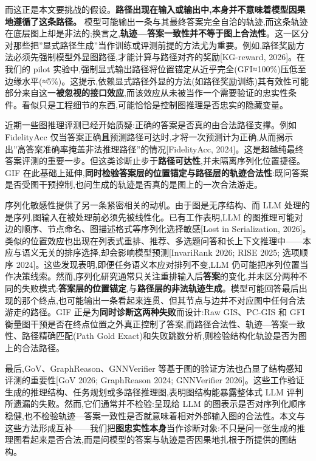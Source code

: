 \documentclass[
  11pt,
]{article}
\begin{document}
而这正是本文要挑战的假设。\textbf{路径出现在输入或输出中,本身并不意味着模型因果地遵循了这条路径。}
模型可能输出一条与其最终答案完全自洽的轨迹,而这条轨迹在底层图上却是非法的;换言之,\textbf{轨迹---答案一致性并不等于图上合法性}。这一区分对那些把''显式路径生成''当作训练或评测前提的方法尤为重要。例如,路径奖励方法必须先强制模型外显图路径,才能计算与路径对齐的奖励{[}KG-reward,
2026{]}。在我们的 pilot
实验中,强制显式输出路径将位置锚定从近乎完全(GFI≈100\%)压低至边缘水平(≈5\%)。这提示,依赖显式路径外显的方法(如路径奖励训练)其有效性可能部分来自这一\textbf{被忽视的接口效应},而该效应从未被当作一个需要验证的忠实性条件。看似只是工程细节的东西,可能恰恰是控制图推理是否忠实的隐藏变量。

近期一些图推理评测已经开始质疑:正确的答案是否真的由合法路径支撑。例如
FidelityAcc
仅当答案正确\textbf{且}预测路径可达时,才将一次预测计为正确,从而揭示出''高答案准确率掩盖非法推理路径''的情况{[}FidelityAcc,
2024{]}。这是超越纯最终答案评测的重要一步。但这类诊断止步于\textbf{路径可达性},并未隔离序列化位置捷径。GIF
在此基础上延伸,\textbf{同时检验答案层的位置锚定与路径层的轨迹合法性}:既问答案是否受图干预控制,也问生成的轨迹是否真的是图上的一次合法游走。

序列化敏感性提供了另一条紧密相关的动机。由于图是无序结构、而 LLM
处理的是序列,图输入在被处理前必须先被线性化。已有工作表明,LLM
的图推理可能对边的顺序、节点命名、图描述格式等序列化选择敏感{[}Lost in
Serialization,
2026{]}。类似的位置效应也出现在列表式重排、推荐、多选题问答和长上下文推理中------本应与语义无关的排序选择,却会影响模型预测{[}InvariRank
2026; RISE 2025; 选项顺序
2024{]}。这些发现表明,即便任务语义本应对排列不变,LLM
仍可能把序列位置当作决策线索。然而,序列化研究通常只关注重排输入后\textbf{答案}的变化,并未区分两种不同的失败模式:\textbf{答案层的位置锚定},与\textbf{路径层的非法轨迹生成}。模型可能回答最后出现的那个终点,也可能输出一条看起来连贯、但其节点与边并不对应图中任何合法游走的路径。GIF
正是为\textbf{同时诊断这两种失败}而设计:Raw GIS、PC-GIS 和 GFI
衡量图干预是否在终点位置之外真正控制了答案,而路径合法性、轨迹---答案一致性、路径精确匹配(Path
Gold Exact)和失败跳数分析,则检验结构化轨迹是否为图上的合法路径。

最后,GoV、GraphReason、GNNVerifier
等基于图的验证方法也凸显了结构感知评测的重要性{[}GoV 2026; GraphReason
2024; GNNVerifier
2026{]}。这些工作验证生成的推理结构、任务规划或多路径推理图,表明图结构能暴露整体式
LLM 评判所遗漏的失败。然而,它们通常并不检验:呈现给 LLM
的图表示是否对序列化顺序稳健,也不检验轨迹---答案一致性是否就意味着相对外部输入图的合法性。本文与这些方法形成互补------我们把\textbf{图忠实性本身}当作诊断对象:不只是问一张生成的推理图看起来是否合法,而是问模型的答案与轨迹是否因果地扎根于所提供的图结构。
\end{document}
